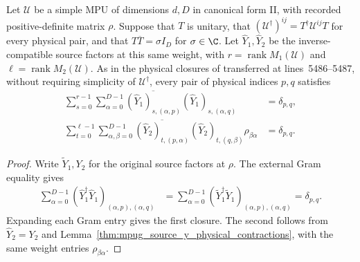 \begin{lemma}
    \label{thm:mpug_inverse_source_y_physical}
    \leanok
    Let $\mathcal U$ be a simple MPU of dimensions $d,D$ in canonical
    form II, with recorded positive-definite matrix $\rho$. Suppose
    that $T$ is unitary, that
    $(\mathcal U^\dagger)^{ij}=T^\dagger\mathcal U^{ij}T$ for every
    physical pair, and that $T\overline T=\sigma I_D$ for $\sigma\in\C$.
    Let $\widehat Y_1,\widehat Y_2$ be the inverse-compatible source
    factors at this same weight, with $r=\operatorname{rank}M_1(\mathcal U)$
    and $\ell=\operatorname{rank}M_2(\mathcal U)$. As in the physical closures
    of \cite[lines~869--917]{FrancoRubio2025MPUGauging} transferred at
    lines~5486--5487, without requiring simplicity of $\mathcal U^\dagger$,
    every pair of physical indices $p,q$ satisfies
    \begin{align}
        \sum_{s=0}^{r-1}\sum_{\alpha=0}^{D-1}
        \overline{(\widehat Y_1)_{s,(\alpha,p)}}
        (\widehat Y_1)_{s,(\alpha,q)}
         & =\delta_{p,q}, \\
        \sum_{t=0}^{\ell-1}\sum_{\alpha,\beta=0}^{D-1}
        \overline{(\widehat Y_2)_{t,(p,\alpha)}}
        (\widehat Y_2)_{t,(q,\beta)}\rho_{\beta\alpha}
         & =\delta_{p,q}.
    \end{align}
\end{lemma}
\begin{proof}\leanok
    Write $\widetilde Y_1,Y_2$ for the original source factors at $\rho$.
    The external Gram equality gives
    \begin{align}
        \sum_{\alpha=0}^{D-1}
        (\widehat Y_1^\dagger\widehat Y_1)_{(\alpha,p),(\alpha,q)}
         & =\sum_{\alpha=0}^{D-1}
        (\widetilde Y_1^\dagger\widetilde Y_1)_{(\alpha,p),(\alpha,q)}
        =\delta_{p,q}.
    \end{align}
    Expanding each Gram entry gives the first closure.
    The second follows from $\widehat Y_2=Y_2$ and
    Lemma~\ref{thm:mpug_source_y_physical_contractions}, with the
    same weight entries $\rho_{\beta\alpha}$.
\end{proof}

